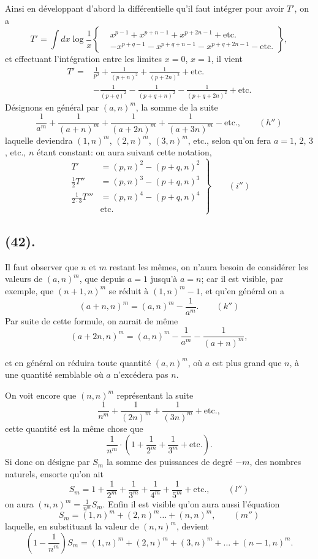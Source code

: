 \documentclass{article}
\begin{document}
Ainsi en développant d'abord la différentielle qu'il faut intégrer pour avoir $T'$, on a
\[ T'=\int dx\log\frac{1}{x}\left\{\begin{aligned} &x^{p-1}+x^{p+n-1}+x^{p+2n-1}+\text{etc.}\\ &-x^{p+q-1}-x^{p+q+n-1}-x^{p+q+2n-1}-\text{etc.} \end{aligned}\right\}, \]
et effectuant l'intégration entre les limites $x=0$, $x=1$, il vient
\[ \begin{aligned} T'={}&\frac{1}{p^{2}}+\frac{1}{(p+n)^{2}}+\frac{1}{(p+2n)^{2}}+\text{etc.}\\ &-\frac{1}{(p+q)^{2}}-\frac{1}{(p+q+n)^{2}}-\frac{1}{(p+q+2n)^{2}}+\text{etc.} \end{aligned} \]
Désignons en général par $(a,n)^{m}$, la somme de la suite
\[ \frac{1}{a^{m}}+\frac{1}{(a+n)^{m}}+\frac{1}{(a+2n)^{m}}+\frac{1}{(a+3n)^{m}}-\text{etc.},\qquad(h'') \]
laquelle deviendra $(1,n)^{m}$, $(2,n)^{m}$, $(3,n)^{m}$, etc., selon qu'on fera $a=1$, $2$, $3$, etc., $n$ étant constant: on aura suivant cette notation,
\[ \left.\begin{aligned} T'&=(p,n)^{2}-(p+q,n)^{2}\\ \tfrac{1}{2}T''&=(p,n)^{3}-(p+q,n)^{3}\\ \tfrac{1}{2\cdot 3}T'''&=(p,n)^{4}-(p+q,n)^{4}\\ &\text{etc.} \end{aligned}\right\}\qquad(i'') \]

\subsection*{(42).}

Il faut observer que $n$ et $m$ restant les mêmes, on n'aura besoin de considérer les valeurs de $(a,n)^{m}$, que depuis $a=1$ jusqu'à $a=n$; car il est visible, par exemple, que $(n+1,n)^{m}$ se réduit à $(1,n)^{m}-1$, et qu'en général on a
\[ (a+n,n)^{m}=(a,n)^{m}-\frac{1}{a^{m}}.\qquad(k'') \]
Par suite de cette formule, on aurait de même
\[ (a+2n,n)^{m}=(a,n)^{m}-\frac{1}{a^{m}}-\frac{1}{(a+n)^{m}}, \]

et en général on réduira toute quantité $(a,n)^{m}$, où $a$ est plus grand que $n$, à une quantité semblable où $a$ n'excédera pas $n$.

On voit encore que $(n,n)^{m}$ représentant la suite
\[ \frac{1}{n^{m}}+\frac{1}{(2n)^{m}}+\frac{1}{(3n)^{m}}+\text{etc.}, \]
cette quantité est la même chose que
\[ \frac{1}{n^{m}}\cdot\left(1+\frac{1}{2^{m}}+\frac{1}{3^{m}}+\text{etc.}\right). \]
Si donc on désigne par $S_{m}$ la somme des puissances de degré $-m$, des nombres naturels, ensorte qu'on ait
\[ S_{m}=1+\frac{1}{2^{m}}+\frac{1}{3^{m}}+\frac{1}{4^{m}}+\frac{1}{5^{m}}+\text{etc.},\qquad(l'') \]
on aura $(n,n)^{m}=\frac{1}{n^{m}}S_{m}$. Enfin il est visible qu'on aura aussi l'équation
\[ S_{m}=(1,n)^{m}+(2,n)^{m}\ldots+(n,n)^{m},\qquad(m'') \]
laquelle, en substituant la valeur de $(n,n)^{m}$, devient
\[ \left(1-\frac{1}{n^{m}}\right)S_{m}=(1,n)^{m}+(2,n)^{m}+(3,n)^{m}+\ldots+(n-1,n)^{m}. \]
\end{document}
